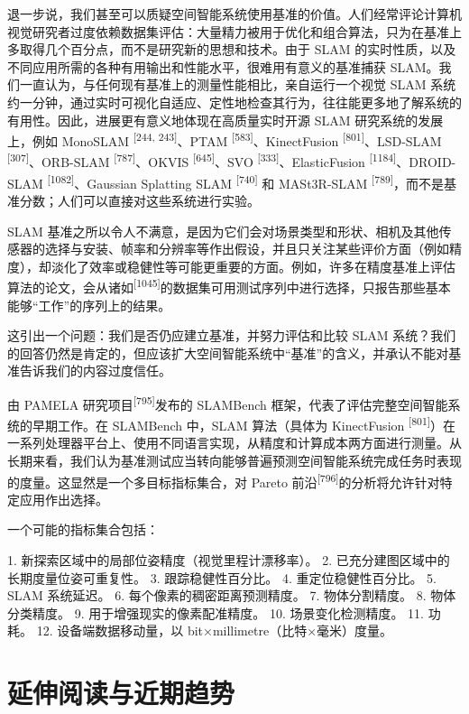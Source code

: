 退一步说，我们甚至可以质疑空间智能系统使用基准的价值。人们经常评论计算机视觉研究者过度依赖数据集评估：大量精力被用于优化和组合算法，只为在基准上多取得几个百分点，而不是研究新的思想和技术。由于 SLAM 的实时性质，以及不同应用所需的各种有用输出和性能水平，很难用有意义的基准捕获 SLAM。我们一直认为，与任何现有基准上的测量性能相比，亲自运行一个视觉 SLAM 系统约一分钟，通过实时可视化自适应、定性地检查其行为，往往能更多地了解系统的有用性。因此，进展更有意义地体现在高质量实时开源 SLAM 研究系统的发展上，例如 MonoSLAM \textsuperscript{[244, 243]}、PTAM \textsuperscript{[583]}、KinectFusion \textsuperscript{[801]}、LSD-SLAM \textsuperscript{[307]}、ORB-SLAM \textsuperscript{[787]}、OKVIS \textsuperscript{[645]}、SVO \textsuperscript{[333]}、ElasticFusion \textsuperscript{[1184]}、DROID-SLAM \textsuperscript{[1082]}、Gaussian Splatting SLAM \textsuperscript{[740]} 和 MASt3R-SLAM \textsuperscript{[789]}，而不是基准分数；人们可以直接对这些系统进行实验。

SLAM 基准之所以令人不满意，是因为它们会对场景类型和形状、相机及其他传感器的选择与安装、帧率和分辨率等作出假设，并且只关注某些评价方面（例如精度），却淡化了效率或稳健性等可能更重要的方面。例如，许多在精度基准上评估算法的论文，会从诸如\textsuperscript{[1045]}的数据集可用测试序列中进行选择，只报告那些基本能够“工作”的序列上的结果。

这引出一个问题：我们是否仍应建立基准，并努力评估和比较 SLAM 系统？我们的回答仍然是肯定的，但应该扩大空间智能系统中“基准”的含义，并承认不能对基准告诉我们的内容过度信任。

由 PAMELA 研究项目\textsuperscript{[795]}发布的 SLAMBench 框架，代表了评估完整空间智能系统的早期工作。在 SLAMBench 中，SLAM 算法（具体为 KinectFusion \textsuperscript{[801]}）在一系列处理器平台上、使用不同语言实现，从精度和计算成本两方面进行测量。从长期来看，我们认为基准测试应当转向能够普遍预测空间智能系统完成任务时表现的度量。这显然是一个多目标指标集合，对 Pareto 前沿\textsuperscript{[796]}的分析将允许针对特定应用作出选择。

一个可能的指标集合包括：

1. 新探索区域中的局部位姿精度（视觉里程计漂移率）。
2. 已充分建图区域中的长期度量位姿可重复性。
3. 跟踪稳健性百分比。
4. 重定位稳健性百分比。
5. SLAM 系统延迟。
6. 每个像素的稠密距离预测精度。
7. 物体分割精度。
8. 物体分类精度。
9. 用于增强现实的像素配准精度。
10. 场景变化检测精度。
11. 功耗。
12. 设备端数据移动量，以 bit×millimetre（比特×毫米）度量。

\section{延伸阅读与近期趋势}

